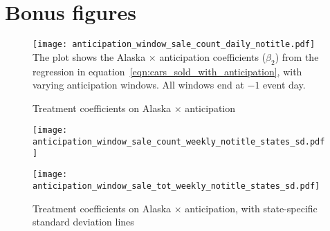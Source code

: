 \documentclass[11pt,letterpaper,oneside]{article}
\begin{document}
\pagebreak
\printbibliography



\appendix

\section{Bonus figures}

\begin{figure}[hbt]
    \caption{Treatment coefficients on Alaska $\times$ anticipation}
    \label{bonusfig:anticipation_window_sale_count_daily}
    \texttt{[image: anticipation\_window\_sale\_count\_daily\_notitle.pdf]}
    {\footnotesize
    The plot shows the Alaska $\times$ anticipation coefficients ($\beta_2$) from the regression in equation~\ref{eqn:cars_sold_with_anticipation}, with varying anticipation windows.
    All windows end at $-1$ event day.
    }
\end{figure}

\begin{figure}[hbt]
	\caption{Treatment coefficients on Alaska $\times$ anticipation, with state-specific standard deviation lines}
	\label{bonusfig:anticipation_window_sale_count_and_tot_weekly_states_sd}
	\texttt{[image: anticipation\_window\_sale\_count\_weekly\_notitle\_states\_sd.pdf]}

	\texttt{[image: anticipation\_window\_sale\_tot\_weekly\_notitle\_states\_sd.pdf]}
\end{figure}

\end{document}
